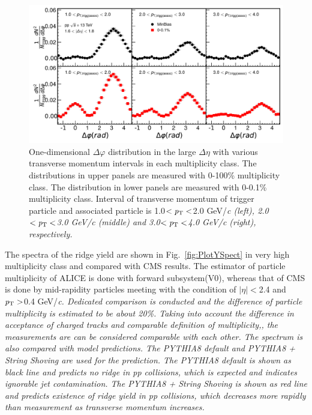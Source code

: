 \begin{figure}[h!]
	\centering
	\includegraphics[width=0.99\linewidth]{./figures/Fig2_PlotDeltaPhi.pdf}
	\caption{One-dimensional $\Delta\varphi$ distribution in the large $\Delta\eta$ with various transverse momentum intervals in each multiplicity class. The distributions in upper panels are measured with 0-100\% multiplicity class. The distribution in lower panels are measured with 0-0.1\% multiplicity class. Interval of transverse momentum of trigger particle and associated particle is 1.0$<\it{p}_{\rm{T}}<$2.0 GeV/\it{c}\rm{} (left), 2.0$<\it{p}_{\rm{T}}<$3.0 GeV/\it{c}\rm{} (middle) and 3.0$<\it{p}_{\rm{T}}<$4.0 GeV/\it{c}\rm{} (right), respectively. }
	\label{fig:PlotDeltaPhi}
\end{figure}
 
The spectra of the ridge yield are shown in Fig.~\ref{fig:PlotYSpect} in very high multiplicity class and compared with CMS results. The estimator of particle multiplicity of ALICE is done with forward subsystem(V0), whereas that of CMS is done by mid-rapidity particles meeting with the condition of $|\eta|<$2.4 and $\it{p}_{\rm{T}}>$0.4 GeV/\it{c}\rm{}. Dedicated comparison is conducted and the difference of particle multiplicity is estimated to be about 20\%. Taking into account the difference in acceptance of charged tracks and comparable definition of multiplicity,, the measurements are can be considered comparable with each other. The spectrum is also compared with model predictions. The PYTHIA8 default and PYTHIA8 + String Shoving are used for the prediction. The PYTHIA8 default is shown as black line and predicts no ridge in pp collisions, which is expected and indicates ignorable jet contamination. The PYTHIA8 + String Shoving is shown as red line and predicts existence of ridge yield in pp collisions, which decreases more rapidly than measurement as transverse momentum increases.

